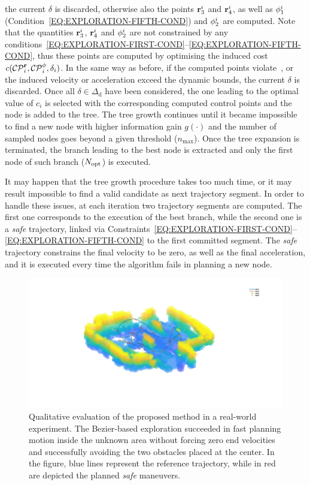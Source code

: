 the current $\delta$ is discarded, otherwise also the points $\mathbf{r}^{i}_3$ and $\mathbf{r}^{i}_4$, as well as $\phi^i_1$
(Condition~\eqref{EQ:EXPLORATION-FIFTH-COND}) and $\phi^i_2$ are computed.  Note that the quantities $\mathbf{r}^{i}_3$, $\mathbf{r}^{i}_4$ and
$\phi^i_2$ are not constrained by any conditions~\eqref{EQ:EXPLORATION-FIRST-COND}--\eqref{EQ:EXPLORATION-FIFTH-COND}, thus these points
are computed by optimising the induced cost $c(\mathcal{CP}_i^{\mathbf{r}}, \mathcal{CP}_i^{\phi}, \delta_i)$. In the same way as before, if the computed points
violate~, or the induced velocity or acceleration exceed the dynamic bounds,
the current $\delta$ is discarded. Once all $\delta \in \Delta_{\text{d}}$ have been considered, the one leading to the optimal value
of $c_i$ is selected with the corresponding computed control points and the node is added to the tree.
The tree growth continues until it became impossible to find a new node with higher information gain $g(\cdot)$ and the number
of sampled nodes goes beyond a given threshold ($n_{\text{max}}$). Once the tree expansion is terminated, the branch leading to
the best node is extracted and only the first node of such branch ($N_\text{opt}$) is executed.

It may happen that the tree growth procedure takes too much time, or it may result impossible to find a
valid candidate as next trajectory segment. In order to handle these issues, at each iteration two trajectory segments are computed.
The first one corresponds to the execution of the best branch, while the second one is a \emph{safe} trajectory,
linked via Constraints~\eqref{EQ:EXPLORATION-FIRST-COND}--\eqref{EQ:EXPLORATION-FIFTH-COND} to the first committed segment.
The \emph{safe} trajectory constrains the final velocity to be zero, as well as the final acceleration, and it is executed every time
the algorithm fails in planning a new node.
\begin{figure}[!t]
	\centering
	\includegraphics[trim={20cm 10cm 23cm 10cm}, clip = true, scale=.18]{Figs/Chapter4/full_exploration.jpg}
	\caption{Qualitative evaluation of the proposed method in a real-world experiment.
			The B\acuteacc ezier-based exploration succeeded in fast planning motion inside the unknown area
			without forcing zero end velocities and successfully avoiding the two obstacles
			placed at the center. In the figure, blue lines represent the reference trajectory, while in red
			are depicted the planned \emph{safe} maneuvers.}%
	\label{FIG:EXPLORATION-REAL-SCENARIO-RESULTS}
\end{figure}
